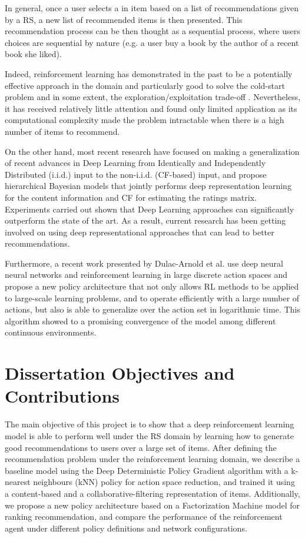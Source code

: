 In general, once a user selects a in item based on a list of recommendations given by a RS, a new list of recommended items is then presented. This recommendation process can be then thought as a sequential process, where users choices are sequential by nature (e.g. a user buy a book by the author of a recent book she liked).

Indeed, reinforcement learning has demonstrated in the past to be a potentially effective approach in the domain and particularly good to solve the cold-start problem and in some extent, the exploration/exploitation trade-off \cite{shani2005mdp}. Nevertheless, it has received relatively little attention and found only limited application as its computational complexity made the problem intractable when there is a high number of items to recommend.

On the other hand, most recent research \cite{wang2015collaborative} have focused on making a generalization of recent advances in Deep Learning \cite{bengio2013representation} from Identically and Independently Distributed (i.i.d.) input to the non-i.i.d. (CF-based) input, and propose hierarchical Bayesian models that jointly performs deep representation learning for the content information and CF for estimating the ratings matrix. Experiments carried out shown that Deep Learning approaches can significantly outperform the state of the art. As a result, current research has been getting involved on using deep representational approaches that can lead to better recommendations.

Furthermore, a recent work presented by Dulac-Arnold et al. \cite{Dulac-Arnold2015} use deep neural neural networks and reinforcement learning in large discrete action spaces  and propose a new policy architecture that not only allows RL methods to be applied to large-scale learning problems, and to operate efficiently with a large number of actions, but also is able to generalize over the action set in logarithmic time. This algorithm showed to a promising convergence of the model among different continuous environments.

\section{Dissertation Objectives and Contributions}

The main objective of this project is to show that a deep reinforcement learning model is able to perform well under the RS domain by learning how to generate good recommendations to users over a large set of items. After defining the recommendation problem under the reinforcement learning domain, we describe a baseline model using the Deep Deterministic Policy Gradient algorithm with a k-nearest neighbours (kNN) policy for action space reduction, and trained it using a content-based and a collaborative-filtering representation of items. Additionally, we propose a new policy architecture based on a Factorization Machine model for ranking recommendation, and compare the performance of the reinforcement agent under different policy definitions and network configurations.

